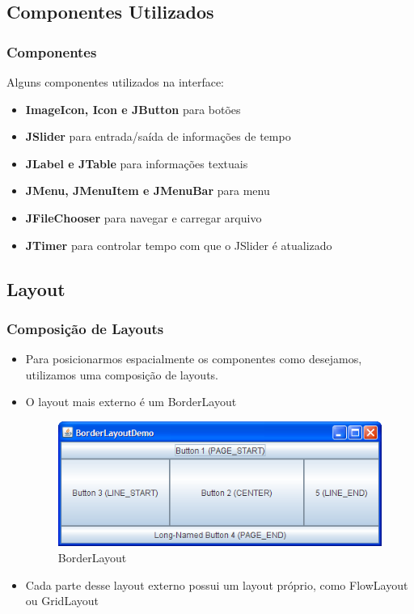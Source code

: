 \documentclass{beamer}
\begin{document}
\subsection{Componentes Utilizados}
\begin{frame}
	\frametitle{Componentes}
Alguns componentes utilizados na interface:	
	\begin{itemize}
		\item \textbf{ImageIcon, Icon e JButton} para botões
		\item \textbf{JSlider} para entrada/saída de informações de tempo
		\item \textbf{JLabel e JTable} para informações textuais
		\item \textbf{JMenu, JMenuItem e JMenuBar} para menu
		\item \textbf{JFileChooser} para navegar e carregar arquivo 
		\item \textbf{JTimer} para controlar tempo com que o JSlider é atualizado
	\end{itemize}
\end{frame}

\subsection{Layout}
\begin{frame}
  \frametitle{Composição de Layouts}
  \begin{itemize}
   \item Para posicionarmos espacialmente os componentes como desejamos, utilizamos uma composição de layouts.
   \item O layout mais externo é um BorderLayout
   \begin{figure}
	\includegraphics[scale=0.5]{./images/BorderLayout.png}
	\caption{BorderLayout}
	\label{fig:BL}
   \end{figure}
   \item Cada parte desse layout externo possui um layout próprio, como FlowLayout ou GridLayout
  \end{itemize}
\end{frame}
\end{document}
